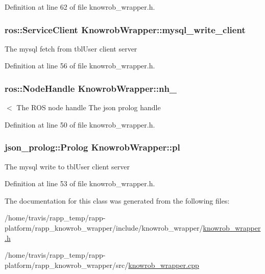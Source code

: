 Definition at line 62 of file knowrob\-\_\-wrapper.\-h.

\hypertarget{classKnowrobWrapper_a3751c23317ae08cb539f51ea1eead504}{
\subsubsection[{mysql\-\_\-write\-\_\-client}]{\setlength{\rightskip}{0pt plus 5cm}ros\-::\-Service\-Client Knowrob\-Wrapper\-::mysql\-\_\-write\-\_\-client\hspace{0.3cm}{\ttfamily [private]}}}\label{classKnowrobWrapper_a3751c23317ae08cb539f51ea1eead504}
The mysql fetch from tbl\-User client server 

Definition at line 56 of file knowrob\-\_\-wrapper.\-h.

\hypertarget{classKnowrobWrapper_a7e3aae6f36c23857030d977fa53e3baf}{
\subsubsection[{nh\-\_\-}]{\setlength{\rightskip}{0pt plus 5cm}ros\-::\-Node\-Handle Knowrob\-Wrapper\-::nh\-\_\-\hspace{0.3cm}{\ttfamily [private]}}}\label{classKnowrobWrapper_a7e3aae6f36c23857030d977fa53e3baf}
$<$ The R\-O\-S node handle The json prolog handle 

Definition at line 50 of file knowrob\-\_\-wrapper.\-h.

\hypertarget{classKnowrobWrapper_a85cb0352dccaebe49a4f382d39911400}{
\subsubsection[{pl}]{\setlength{\rightskip}{0pt plus 5cm}json\-\_\-prolog\-::\-Prolog Knowrob\-Wrapper\-::pl\hspace{0.3cm}{\ttfamily [private]}}}\label{classKnowrobWrapper_a85cb0352dccaebe49a4f382d39911400}
The mysql write to tbl\-User client server 

Definition at line 53 of file knowrob\-\_\-wrapper.\-h.



The documentation for this class was generated from the following files\-:\begin{DoxyCompactItemize}
\item 
/home/travis/rapp\-\_\-temp/rapp-\/platform/rapp\-\_\-knowrob\-\_\-wrapper/include/knowrob\-\_\-wrapper/\hyperlink{knowrob__wrapper_8h}{knowrob\-\_\-wrapper.\-h}\item 
/home/travis/rapp\-\_\-temp/rapp-\/platform/rapp\-\_\-knowrob\-\_\-wrapper/src/\hyperlink{knowrob__wrapper_8cpp}{knowrob\-\_\-wrapper.\-cpp}\end{DoxyCompactItemize}
